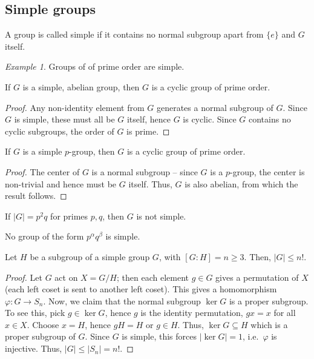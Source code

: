 \documentclass[11pt]{article}
\theoremstyle{definition}
\theoremstyle{remark}
\newtheorem*{example}{Example}
\numberwithin{equation}{section}
\begin{document}
    \subsection{Simple groups}
    
    \begin{definition}
        A group is called simple if it contains no normal subgroup apart from $\{e\}$
        and $G$ itself.
    \end{definition}
    \begin{example}
        Groups of of prime order are simple.
    \end{example}
    
    \begin{lemma}
        If $G$ is a simple, abelian group, then $G$ is a cyclic group of prime order.
    \end{lemma}
    \begin{proof}
        Any non-identity element from $G$ generates a normal subgroup of $G$. Since
        $G$ is simple, these must all be $G$ itself, hence $G$ is cyclic. Since $G$
        contains no cyclic subgroups, the order of $G$ is prime.
    \end{proof}

    \begin{lemma}
        If $G$ is a simple $p$-group, then $G$ is a cyclic group of prime order.
    \end{lemma}
    \begin{proof}
        The center of $G$ is a normal subgroup -- since $G$ is a $p$-group, the
        center is non-trivial and hence must be $G$ itself. Thus, $G$ is also
        abelian, from which the result follows.
    \end{proof}

    \begin{lemma}
        If $|G| = p^2q$ for primes $p, q$, then $G$ is not simple.
    \end{lemma}

    \begin{theorem}[Burnside]
        No group of the form $p^\alpha q^\beta$ is simple.
    \end{theorem}

    \begin{lemma}
        Let $H$ be a subgroup of a simple group $G$, with $[G : H] = n \geq 3$. Then,
        $|G| \leq n!$.
    \end{lemma}
    \begin{proof}
        Let $G$ act on $X = G / H$; then each element $g \in G$ gives a permutation
        of $X$ (each left coset is sent to another left coset). This gives a
        homomorphism $\varphi\colon G \to S_n$. Now, we claim that the normal
        subgroup $\ker{G}$ is a proper subgroup. To see this, pick $g \in \ker{G}$,
        hence $g$ is the identity permutation, $gx = x$ for all $x \in X$. Choose $x
        = H$, hence $gH = H$ or $g \in H$. Thus, $\ker{G} \subseteq H$ which is a
        proper subgroup of $G$. Since $G$ is simple, this forces $|\ker{G}| = 1$,
        i.e.\ $\varphi$ is injective. Thus, $|G| \leq |S_n| = n!$.
    \end{proof}
\end{document}
